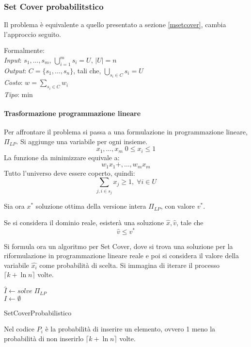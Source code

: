\subsubsection{Set Cover probabilitstico}
Il problema è equivalente a quello presentato a sezione \ref{msetcover}, cambia
l'approccio seguito.

Formalmente: \\
\emph{Input}: $s_1, \dots, s_m$, $\bigcup_{i=1}^m s_i = U$, $|U| = n$\\
\emph{Output}: $C = \{s_1, \dots, s_n\}$, tali che, $\bigcup_{s_i \in C} s_i = U$\\
\emph{Costo}: $w = \sum_{s_i \in C} w_i$\\
\emph{Tipo}: min

\paragraph{Trasformazione programmazione lineare}
Per affrontare il problema si passa a una formulazione in programmazione lineare, $\Pi_{LP}$.
Si aggiunge una variabile per ogni insieme.
$$x_1, \dots, x_m \;0 \leq x_i\leq 1$$
La funzione da minimizzare equivale a:
$$w_1 x_1 +, \dots, w_m x_m $$
Tutto l'universo deve essere coperto, quindi:
$$\sum_{j, i\in s_j} x_j \geq 1, \; \forall i \in U$$

Sia ora $x^*$ soluzione ottima della versione intera $\Pi_{LP}$, con valore 
$v^*$.

Se si considera il dominio reale, esisterà una soluzione $\hat{x}, \hat{v}$, 
tale che $$\hat{v}\leq v^*$$

Si formula ora un algoritmo per Set Cover, dove si trova una soluzione 
per la riformulazione in programmazione lineare reale e poi si considera il valore della
variabile $\hat{x_i}$ come probabilità di scelta. 
Si immagina di iterare il processo $\lceil k + \ln n \rceil$ volte.

\begin{algorithm}[H]
    \SetAlgoLined
    $\hat{I} \gets \mathit{solve} \; \Pi_{LP}$ \\
    $I \gets \emptyset$\\
     \caption{SetCoverProbabilistico}
\end{algorithm}
Nel codice $P_i$ è la probabilità di inserire un elemento, ovvero 1 meno la 
probabilità di non inserirlo $\lceil k + \ln n \rceil$ volte.



